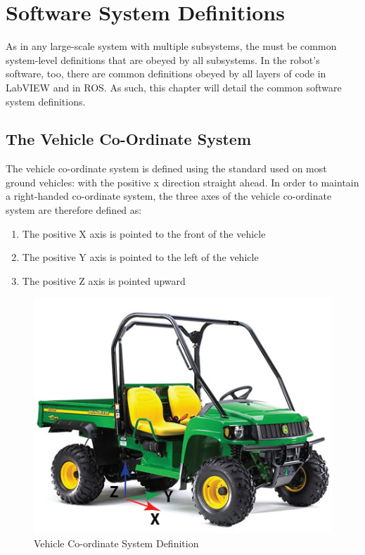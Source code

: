 \chapter{Software System Definitions}

As in any large-scale system with multiple subsystems, the must be common system-level definitions that are obeyed by all subsystems. In the robot's software, too, there are common definitions obeyed by all layers of code in LabVIEW and in ROS. As such, this chapter will detail the common software system definitions.

\section{The Vehicle Co-Ordinate System}

The vehicle co-ordinate system is defined using the standard used on most ground vehicles: with the positive x direction straight ahead. In order to maintain a right-handed co-ordinate system, the three axes of the vehicle co-ordinate system are therefore defined as:

\begin{enumerate}
\item The positive X axis is pointed to the front of the vehicle
\item The positive Y axis is pointed to the left of the vehicle
\item The positive Z axis is pointed upward
\end{enumerate}

\begin{figure}[h!]
\centering
\includegraphics[scale=.7]{Photos/veh_coord.png}
\caption{Vehicle Co-ordinate System Definition}
\label{fig:veh_coord}
\end{figure} 


